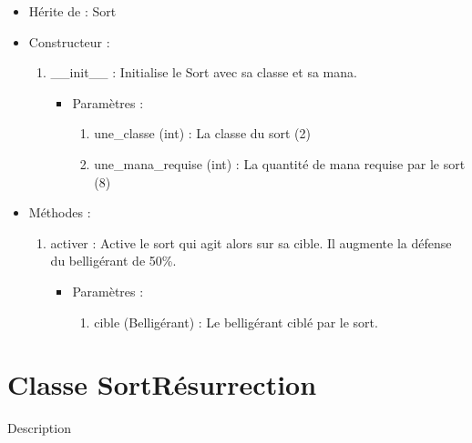 \documentclass[12pt,pdftex,oneside]{article}
\begin{document}
  \begin{itemize}
  \item Hérite de : Sort


  \item Constructeur : 

  \begin{enumerate}
  \item \_\_init\_\_ : Initialise le Sort avec sa classe et sa mana.
    \begin{itemize}
    \item Paramètres : 
      \begin{enumerate}
      \item une\_classe (int) : La classe du sort (2)
      \item une\_mana\_requise (int) : La quantité de mana requise par le sort (8)
      \end{enumerate}
    \end{itemize}

  \end{enumerate}

  \item Méthodes : 

    \begin{enumerate}
    \item activer : Active le sort qui agit alors sur sa cible. Il augmente la
      défense du belligérant de 50\%.
      \begin{itemize}
      \item Paramètres : 
        \begin{enumerate}
        \item cible (Belligérant) : Le belligérant ciblé par le sort.
        \end{enumerate}
      \end{itemize}
    \end{enumerate}

  \end{itemize}

  \section {Classe SortRésurrection}

  Description
\end{document}

